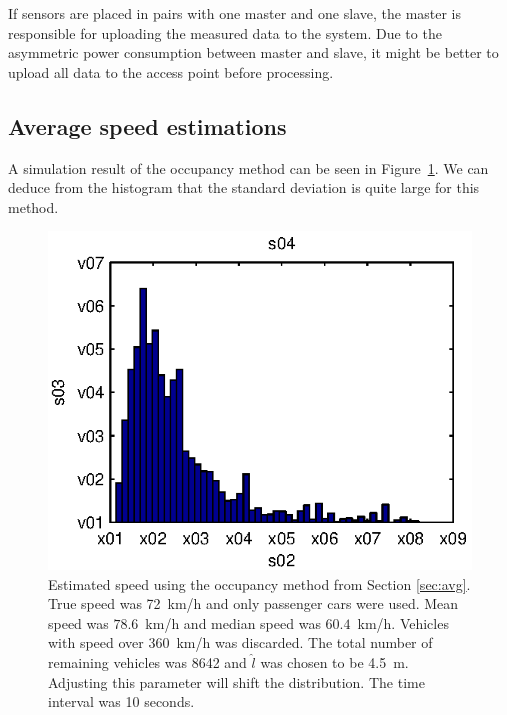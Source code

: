 If sensors are placed in pairs with one master and one slave, the master is responsible for uploading the measured data to the system. Due to the asymmetric power consumption between master and slave, it might be better to upload all data to the access point before processing. 
  
\subsection{Average speed estimations}\label{sec:avg_per}

A simulation result of the occupancy method can be seen in \mbox{Figure \ref{fig:occSpeedHist}}. We can deduce from the histogram that the standard deviation is quite large for this method. 

\begin{figure}
 \centering
 \begin{minipage}{0.45\linewidth}
 \centering
 
 \includegraphics[width=1\linewidth]{images/occupancSpeedHist}
 \caption[Estimated speed using the occupancy method.]{Estimated speed using the occupancy method from Section \ref{sec:avg}. True speed was \mbox{72~km/h} and only passenger cars were used. Mean speed was \mbox{$78.6$~km/h} and median speed was \mbox{$60.4$ km/h}. Vehicles with speed over \mbox{360~km/h} was discarded. The total number of remaining vehicles was 8642 and $\hat{l}$ was chosen to be \mbox{4.5~m}. Adjusting this parameter will shift the distribution. The time interval was 10 seconds.}
 \label{fig:occSpeedHist}

\end{minipage}
\end{figure}
